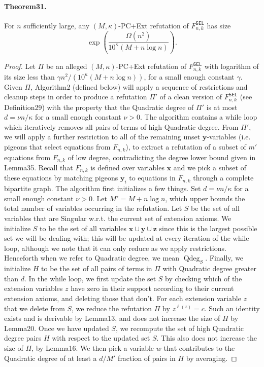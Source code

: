 \documentclass[10pt,a4paper]{article}
\DeclareMathOperator{\Qdeg}{Qdeg}
\begin{document}
\paragraph{Theorem31.} For $n$ sufficiently large, any $(M,\kappa)$-PC+Ext refutation of $F^{\mathsf{SEL}}_{n,k}$ has size
\[\exp\left(\frac{\Omega(n^2)}{10^{\kappa}(M+n\log n)}\right).\]

\begin{proof}
Let $\Pi$ be an alleged $(M,\kappa)$-PC+Ext refutation of $F^{\mathsf{SEL}}_{n,k}$ with logarithm of its size less than $\gamma n^2/(10^{\kappa}(M+n\log n))$, for a small enough constant $\gamma$. Given $\Pi$, Algorithm2 (defined below) will apply a sequence of restrictions and cleanup steps in order to produce a refutation $\Pi'$ of a clean version of $F^{\mathsf{SEL}}_{n,k}$ (see Definition29) with the property that the Quadratic degree of $\Pi'$ is at most $d=\nu n/\kappa$ for a small enough constant $\nu>0$. The algorithm contains a while loop which iteratively removes all pairs of terms of high Quadratic degree. From $\Pi'$, we will apply a further restriction to all of the remaining unset $\mathbf y$-variables (i.e. pigeons that select equations from $F_{n,k}$), to extract a refutation of a subset of $m'$ equations from $F_{n,k}$ of low degree, contradicting the degree lower bound given in Lemma35. Recall that $F_{n,k}$ is defined over variables $\mathbf x$ and we pick a subset of these equations by matching pigeons $\mathbf y_i$ to equations in $F_{n,k}$ through a complete bipartite graph.
The algorithm first initializes a few things. Set $d=\nu n/\kappa$ for a small enough constant $\nu>0$. Let $M'=M+n\log n$, which upper bounds the total number of variables occurring in the refutation. Let $S$ be the set of all variables that are Singular w.r.t. the current set of extension axioms. We initialize $S$ to be the set of all variables $\mathbf x\cup\mathbf y\cup\mathbf z$ since this is the largest possible set we will be dealing with; this will be updated at every iteration of the while loop, although we note that it can only reduce as we apply restrictions. Henceforth when we refer to Quadratic degree, we mean $\Qdeg_S$. Finally, we initialize $H$ to be the set of all pairs of terms in $\Pi$ with Quadratic degree greater than $d$.
In the while loop, we first update the set $S$ by checking which of the extension variables $z$ have zero in their support according to their current extension axioms, and deleting those that don't. For each extension variable $z$ that we delete from $S$, we reduce the refutation $\Pi$ by $z^{\ell(z)}=c$. Such an identity exists and is derivable by Lemma13, and does not increase the size of $H$ by Lemma20. Once we have updated $S$, we recompute the set of high Quadratic degree pairs $H$ with respect to the updated set $S$. This also does not increase the size of $H$, by Lemma16. We then pick a variable $w$ that contributes to the Quadratic degree of at least a $d/M'$ fraction of pairs in $H$ by averaging.

\end{proof}
\end{document}

